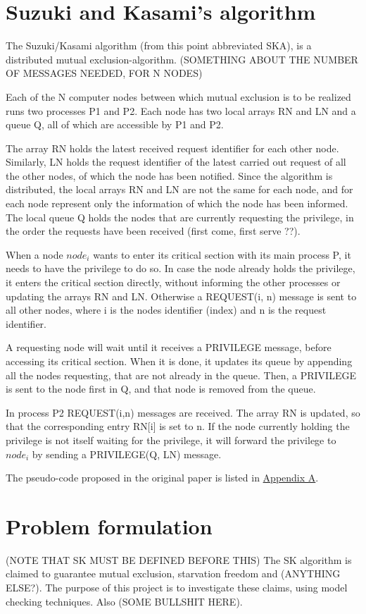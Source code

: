 \documentclass[a4paper,12pt]{article}
\begin{document}
\section{Suzuki and Kasami's algorithm}

The Suzuki/Kasami algorithm (from this point abbreviated SKA), is a distributed mutual exclusion-algorithm. (SOMETHING ABOUT THE NUMBER OF MESSAGES NEEDED, FOR N NODES)

Each of the N computer nodes between which mutual exclusion is to be realized runs two processes P1 and P2. Each node has two local arrays RN and LN and a queue Q, all of which are accessible by P1 and P2.

The array RN holds the latest received request identifier for each other node. Similarly, LN holds the request identifier of the latest carried out request of all the other nodes, of which the node has been notified. Since the algorithm is distributed, the local arrays RN and LN are not the same for each node, and for each node represent only the information of which the node has been informed.
The local queue Q holds the nodes that are currently requesting the privilege, in the order the requests have been received (first come, first serve ??).

When a node $node_i$ wants to enter its critical section with its main process P, it needs to have the privilege to do so. In case the node already holds the privilege, it enters the critical section directly, without informing the other processes or updating the arrays RN and LN. Otherwise a REQUEST(i, n) message is sent to all other nodes, where i is the nodes identifier (index) and n is the request identifier.

A requesting node will wait until it receives a PRIVILEGE message, before accessing its critical section. When it is done, it updates its queue by appending all the nodes requesting, that are not already in the queue. Then, a PRIVILEGE is sent to the node first in Q, and that node is removed from the queue.

In process P2 REQUEST(i,n) messages are received. The array RN is updated, so that the corresponding entry RN[i] is set to n. If the node currently holding the privilege is not itself waiting for the privilege, it will forward the privilege to $node_i$ by sending a PRIVILEGE(Q, LN) message.

The pseudo-code proposed in the original paper is listed in \hyperref[sec:SKA]{Appendix A}.

\section{Problem formulation}
(NOTE THAT SK MUST BE DEFINED BEFORE THIS)
The SK algorithm is claimed to guarantee mutual exclusion, starvation freedom and (ANYTHING ELSE?). The purpose of this project is to investigate these claims, using model checking techniques. Also (SOME BULLSHIT HERE).
\end{document}
